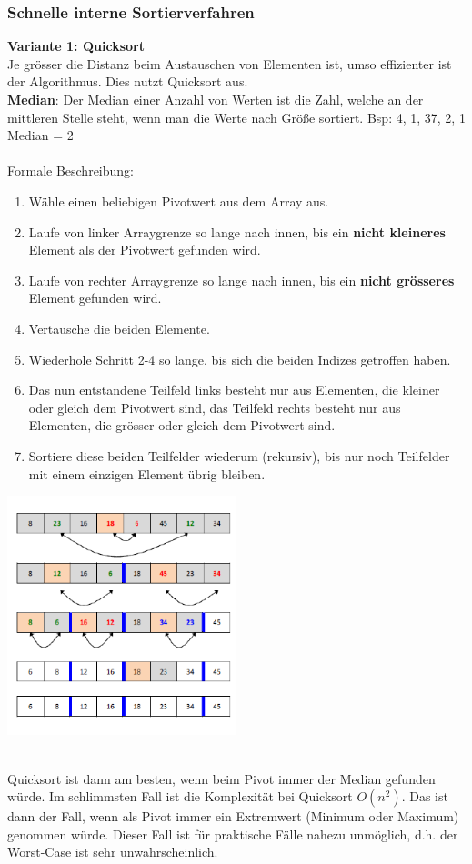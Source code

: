 \subsubsection{Schnelle interne Sortierverfahren}
\textbf{Variante 1: Quicksort}\\
Je grösser die Distanz beim Austauschen von Elementen ist, umso effizienter ist der Algorithmus. Dies nutzt Quicksort aus.\\
\textbf{Median}: Der Median einer Anzahl von Werten ist die Zahl, welche an der mittleren Stelle steht, wenn man die Werte nach Größe sortiert. Bsp: {4, 1, 37, 2, 1} Median = 2\\\\
Formale Beschreibung:
\begin{enumerate}
\item Wähle einen beliebigen Pivotwert aus dem Array aus.
\item Laufe von linker Arraygrenze so lange nach innen, bis ein \textbf{nicht kleineres}
Element als der Pivotwert gefunden wird. 
\item Laufe von rechter Arraygrenze so lange nach innen, bis ein \textbf{nicht grösseres} Element gefunden wird.
\item Vertausche die beiden Elemente.
\item Wiederhole Schritt 2-4 so lange, bis sich die beiden Indizes getroffen haben.
\item Das nun entstandene Teilfeld links besteht nur aus Elementen, die kleiner oder gleich dem Pivotwert sind, das Teilfeld rechts besteht nur aus Elementen, die grösser oder gleich dem Pivotwert sind. 
\item Sortiere diese beiden Teilfelder wiederum (rekursiv), bis nur noch Teilfelder mit einem einzigen Element übrig bleiben.
\end{enumerate}
\begin{multicols}{2}

\includegraphics[width=0.5\textwidth]{images/Algorithmen/Quicksort.png} \ \\ \ \\
\end{multicols}
Quicksort ist dann am besten, wenn beim Pivot immer der Median gefunden würde. Im schlimmsten Fall ist die Komplexität bei Quicksort $O(n^2)$. Das ist dann der Fall, wenn als Pivot immer ein Extremwert (Minimum oder Maximum) genommen würde. Dieser Fall ist für praktische Fälle nahezu unmöglich, d.h. der Worst-Case ist sehr unwahrscheinlich.\\

